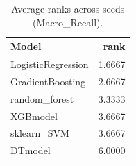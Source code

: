 \begin{table}[t]
\centering
\begin{tabular}{lr}
\toprule
Model & rank \\
\midrule
LogisticRegression & 1.6667 \\
GradientBoosting & 2.6667 \\
random_forest & 3.3333 \\
XGBmodel & 3.6667 \\
sklearn_SVM & 3.6667 \\
DTmodel & 6.0000 \\
\bottomrule
\end{tabular}
\caption{Average ranks across seeds (Macro_Recall).}
\label{tab:avg_rank_Macro_Recall}
\end{table}